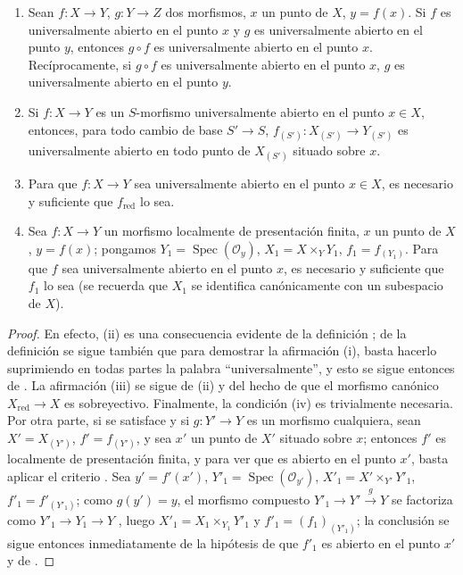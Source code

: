 \begin{proposition}[14.3.4]
\label{IV.14.3.4}
\begin{enumerate}[label=\textup{(\roman*)}]
  \item Sean $f:X\to Y$, $g:Y\to Z$ dos morfismos, $x$ un punto de $X$, $y=f(x)$.
  Si $f$ es universalmente abierto en el punto $x$ y $g$ es universalmente abierto en el punto $y$, entonces $g\circ f$ es universalmente abierto en el punto $x$.
  Recíprocamente, si $g\circ f$ es universalmente abierto en el punto $x$, $g$ es universalmente abierto en el punto $y$.

  \item Si $f:X\to Y$ es un $S$-morfismo universalmente abierto en el punto $x\in X$, entonces, para todo cambio de base $S'\to S$, $f_{(S')}:X_{(S')}\to Y_{(S')}$ es universalmente abierto en todo punto de $X_{(S')}$ situado sobre $x$.

  \item Para que $f:X\to Y$ sea universalmente abierto en el punto $x\in X$, es necesario y suficiente que $f_{\mathrm{red}}$ lo sea.

  \item Sea $f:X\to Y$ un morfismo localmente de presentación finita, $x$ un punto de $X$, $y=f(x)$; pongamos $Y_1=\operatorname{Spec}(\mathcal O_y)$, $X_1=X\times_Y Y_1$, $f_1=f_{(Y_1)}$.
  Para que $f$ sea universalmente abierto en el punto $x$, es necesario y suficiente que $f_1$ lo sea \textup{(se recuerda  que $X_1$ se identifica canónicamente con un subespacio de $X$)}.
\end{enumerate}
\end{proposition}

\begin{proof}
En efecto, (ii) es una consecuencia evidente de la definición ; de la definición se sigue también que para demostrar la afirmación (i), basta hacerlo suprimiendo en todas partes la palabra ``universalmente'', y esto se sigue entonces de .
La afirmación (iii) se sigue de (ii) y del hecho de que el morfismo canónico $X_{\mathrm{red}}\to X$ es sobreyectivo.
Finalmente, la condición (iv) es trivialmente necesaria.
Por otra parte, si se satisface y si $g:Y'\to Y$ es un morfismo cualquiera, sean $X'=X_{(Y')}$, $f'=f_{(Y')}$, y sea $x'$ un punto de $X'$ situado sobre $x$; entonces $f'$ es localmente de presentación finita, y para ver que es abierto en el punto $x'$, basta aplicar el criterio {}.
Sea $y'=f'(x')$, $Y'_1=\operatorname{Spec}(\mathcal O_{y'})$, $X'_1=X'\times_{Y'}Y'_1$, $f'_1=f'_{(Y'_1)}$; como $g(y')=y$, el morfismo compuesto $Y'_1\to Y'\xrightarrow{g}Y$ se factoriza como $Y'_1\to Y_1\to Y$ , luego $X'_1=X_1\times_{Y_1}Y'_1$ y $f'_1=(f_1)_{(Y'_1)}$; la conclusión se sigue entonces inmediatamente de la hipótesis de que $f'_1$ es abierto en el punto $x'$ y de .
\end{proof}

